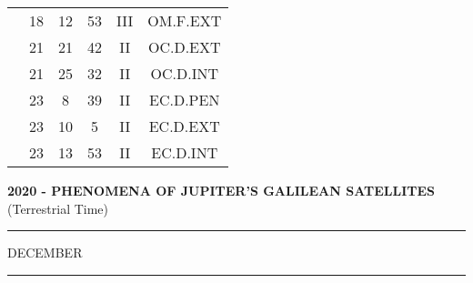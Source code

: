 \documentclass[12pt, a4paper]{article}
\begin{document}
\begin{multicols}{3}
{\begin{tabular}{c c c c c c}
	 	 	 	 & 18 & 12 & 53 & III & OM.F.EXT\\%
	 	 	 	 & 21 & 21 & 42 & II & OC.D.EXT\\%
	 	 	 	 & 21 & 25 & 32 & II & OC.D.INT\\%
	 	 	 	 & 23 & 8 & 39 & II & EC.D.PEN\\%
	 	 	 	 & 23 & 10 & 5 & II & EC.D.EXT\\%
	 	 	 	 & 23 & 13 & 53 & II & EC.D.INT\\%
	 	 \end{tabular}
 	}
\end{multicols}
\textbf{2020 - PHENOMENA OF JUPITER'S GALILEAN SATELLITES}\\(Terrestrial Time) 
\vspace{0.1cm} \hrule \vspace{0.1cm}
DECEMBER\vspace{0.1cm}
\hrule
\vspace{-0.2cm}
\end{document}
